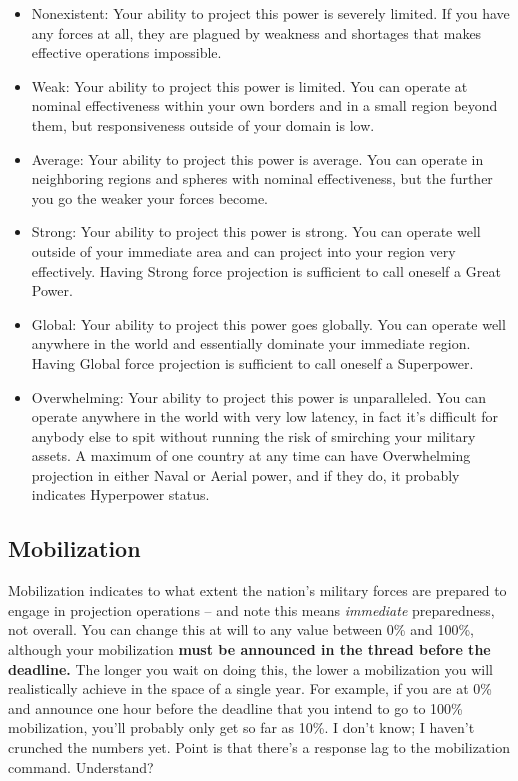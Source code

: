 \documentclass[11 pt]{scrartcl}
\begin{document}
\begin{itemize}
\item Nonexistent: Your ability to project this power is severely limited. If you have any forces at all, they are plagued by weakness and shortages that makes effective operations impossible.
\item Weak: Your ability to project this power is limited. You can operate at nominal effectiveness within your own borders and in a small region beyond them, but responsiveness outside of your domain is low.
\item Average: Your ability to project this power is average. You can operate in neighboring regions and spheres with nominal effectiveness, but the further you go the weaker your forces become.
\item Strong: Your ability to project this power is strong. You can operate well outside of your immediate area and can project into your region very effectively. Having Strong force projection is sufficient to call oneself a Great Power.
\item Global: Your ability to project this power goes globally. You can operate well anywhere in the world and essentially dominate your immediate region. Having Global force projection is sufficient to call oneself a Superpower.
\item Overwhelming: Your ability to project this power is unparalleled. You can operate anywhere in the world with very low latency, in fact it's difficult for anybody else to spit without running the risk of smirching your military assets. A maximum of one country at any time can have Overwhelming projection in either Naval or Aerial power, and if they do, it probably indicates Hyperpower status.
\end{itemize}

\subsection{Mobilization}

Mobilization indicates to what extent the nation's military forces are prepared to engage in projection operations -- and note this means \textit{immediate} preparedness, not overall. You can change this at will to any value between 0\% and 100\%, although your mobilization \textbf{must be announced in the thread before the deadline.} The longer you wait on doing this, the lower a mobilization you will realistically achieve in the space of a single year. For example, if you are at 0\% and announce one hour before the deadline that you intend to go to 100\% mobilization, you'll probably only get so far as 10\%. I don't know; I haven't crunched the numbers yet. Point is that there's a response lag to the mobilization command. Understand?
\end{document}
